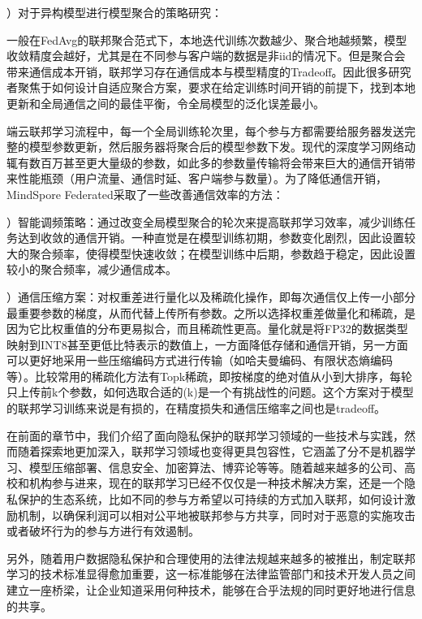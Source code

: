 \documentclass[letterpaper,10pt,english]{sphinxmanual}
\begin{document}
）对于异构模型进行模型聚合的策略研究：

\sphinxAtStartPar
一般在FedAvg的联邦聚合范式下，本地迭代训练次数越少、聚合地越频繁，模型收敛精度会越好，尤其是在不同参与客户端的数据是非iid的情况下。但是聚合会带来通信成本开销，联邦学习存在通信成本与模型精度的Trade\sphinxhyphen{}off。因此很多研究者聚焦于如何设计自适应聚合方案，要求在给定训练时间开销的前提下，找到本地更新和全局通信之间的最佳平衡，令全局模型的泛化误差最小。

\sphinxAtStartPar
{}

\sphinxAtStartPar
端云联邦学习流程中，每一个全局训练轮次里，每个参与方都需要给服务器发送完整的模型参数更新，然后服务器将聚合后的模型参数下发。现代的深度学习网络动辄有数百万甚至更大量级的参数，如此多的参数量传输将会带来巨大的通信开销带来性能瓶颈（用户流量、通信时延、客户端参与数量）。为了降低通信开销，MindSpore
Federated采取了一些改善通信效率的方法：

）智能调频策略：通过改变全局模型聚合的轮次来提高联邦学习效率，减少训练任务达到收敛的通信开销。一种直觉是在模型训练初期，参数变化剧烈，因此设置较大的聚合频率，使得模型快速收敛；在模型训练中后期，参数趋于稳定，因此设置较小的聚合频率，减少通信成本。

）通信压缩方案：对权重差进行量化以及稀疏化操作，即每次通信仅上传一小部分最重要参数的梯度，从而代替上传所有参数。之所以选择权重差做量化和稀疏，是因为它比权重值的分布更易拟合，而且稀疏性更高。量化就是将FP32的数据类型映射到INT8甚至更低比特表示的数值上，一方面降低存储和通信开销，另一方面可以更好地采用一些压缩编码方式进行传输（如哈夫曼编码、有限状态熵编码等）。比较常用的稀疏化方法有Top\sphinxhyphen{}k稀疏，即按梯度的绝对值从小到大排序，每轮只上传前k个参数，如何选取合适的(k)是一个有挑战性的问题。这个方案对于模型的联邦学习训练来说是有损的，在精度损失和通信压缩率之间也是trade\sphinxhyphen{}off。

\sphinxAtStartPar
{}

\sphinxAtStartPar
在前面的章节中，我们介绍了面向隐私保护的联邦学习领域的一些技术与实践，然而随着探索地更加深入，联邦学习领域也变得更具包容性，它涵盖了分不是机器学习、模型压缩部署、信息安全、加密算法、博弈论等等。随着越来越多的公司、高校和机构参与进来，现在的联邦学习已经不仅仅是一种技术解决方案，还是一个隐私保护的生态系统，比如不同的参与方希望以可持续的方式加入联邦，如何设计激励机制，以确保利润可以相对公平地被联邦参与方共享，同时对于恶意的实施攻击或者破坏行为的参与方进行有效遏制。

\sphinxAtStartPar
另外，随着用户数据隐私保护和合理使用的法律法规越来越多的被推出，制定联邦学习的技术标准显得愈加重要，这一标准能够在法律监管部门和技术开发人员之间建立一座桥梁，让企业知道采用何种技术，能够在合乎法规的同时更好地进行信息的共享。
\end{document}
